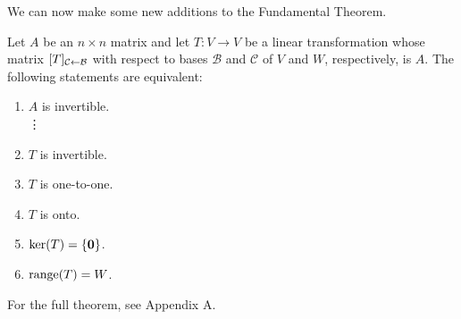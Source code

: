 \documentclass[../m073main.tex]{subfiles}
\begin{document}
We can now make some new additions to the Fundamental Theorem.

\begin{theorem}
	Let $A$ be an $n\times n$ matrix and let $T : V \to V$ be a linear transformation whose matrix $[T]_{\mathcal{C} \leftarrow \mathcal{B}}$ with respect to bases $\mathcal{B}$ and $\mathcal{C}$ of $V$ and $W$, respectively, is $A$.
	The following statements are equivalent:
	\begin{enumerate}[label=(\alph*)]
		\item $A$ is invertible. \\
		\phantom{~}\hspace{-19.5pt} \vdots
		\setcounter{enumi}{15}
		\item $T$ is invertible.
		\item $T$ is one-to-one.
		\item $T$ is onto.
		\item $\textrm{ker}(T) = \{\mathbf{0}\}$.
		\item $\textrm{range}(T) = W$.
	\end{enumerate}
	For the full theorem, see Appendix A.
\end{theorem}
\end{document}
